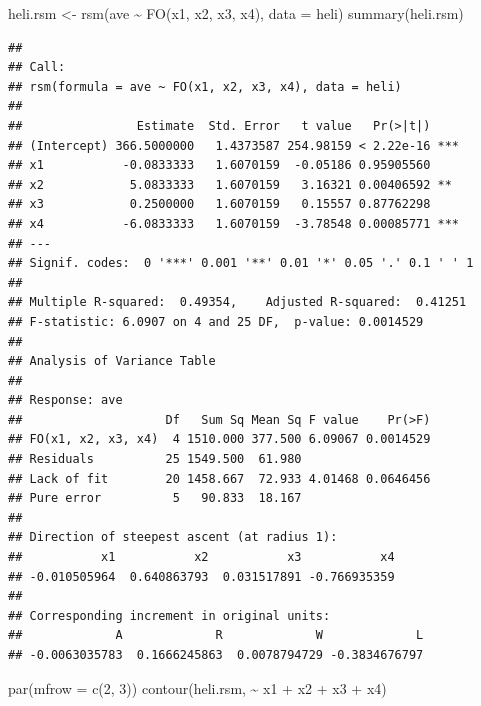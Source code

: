 \documentclass[
]{book}
\newenvironment{Shaded}{\begin{snugshade}}{\end{snugshade}}
\newcommand{\AttributeTok}[1]{\textcolor[rgb]{0.77,0.63,0.00}{#1}}
\newcommand{\DecValTok}[1]{\textcolor[rgb]{0.00,0.00,0.81}{#1}}
\newcommand{\FunctionTok}[1]{\textcolor[rgb]{0.00,0.00,0.00}{#1}}
\newcommand{\NormalTok}[1]{#1}
\newcommand{\OtherTok}[1]{\textcolor[rgb]{0.56,0.35,0.01}{#1}}
\newcommand{\SpecialCharTok}[1]{\textcolor[rgb]{0.00,0.00,0.00}{#1}}
\theoremstyle{definition}
\theoremstyle{definition}
\theoremstyle{definition}
\theoremstyle{definition}
\theoremstyle{remark}
\begin{document}
\begin{Shaded}
\begin{Highlighting}[]
\NormalTok{heli.rsm }\OtherTok{\textless{}{-}} \FunctionTok{rsm}\NormalTok{(ave }\SpecialCharTok{\textasciitilde{}}  \FunctionTok{FO}\NormalTok{(x1, x2, x3, x4), }\AttributeTok{data =}\NormalTok{ heli)}
\FunctionTok{summary}\NormalTok{(heli.rsm)}
\end{Highlighting}
\end{Shaded}

\begin{verbatim}
## 
## Call:
## rsm(formula = ave ~ FO(x1, x2, x3, x4), data = heli)
## 
##                Estimate  Std. Error   t value   Pr(>|t|)    
## (Intercept) 366.5000000   1.4373587 254.98159 < 2.22e-16 ***
## x1           -0.0833333   1.6070159  -0.05186 0.95905560    
## x2            5.0833333   1.6070159   3.16321 0.00406592 ** 
## x3            0.2500000   1.6070159   0.15557 0.87762298    
## x4           -6.0833333   1.6070159  -3.78548 0.00085771 ***
## ---
## Signif. codes:  0 '***' 0.001 '**' 0.01 '*' 0.05 '.' 0.1 ' ' 1
## 
## Multiple R-squared:  0.49354,    Adjusted R-squared:  0.41251 
## F-statistic: 6.0907 on 4 and 25 DF,  p-value: 0.0014529
## 
## Analysis of Variance Table
## 
## Response: ave
##                    Df   Sum Sq Mean Sq F value    Pr(>F)
## FO(x1, x2, x3, x4)  4 1510.000 377.500 6.09067 0.0014529
## Residuals          25 1549.500  61.980                  
## Lack of fit        20 1458.667  72.933 4.01468 0.0646456
## Pure error          5   90.833  18.167                  
## 
## Direction of steepest ascent (at radius 1):
##           x1           x2           x3           x4 
## -0.010505964  0.640863793  0.031517891 -0.766935359 
## 
## Corresponding increment in original units:
##             A             R             W             L 
## -0.0063035783  0.1666245863  0.0078794729 -0.3834676797
\end{verbatim}

\begin{Shaded}
\begin{Highlighting}[]
 \FunctionTok{par}\NormalTok{(}\AttributeTok{mfrow =} \FunctionTok{c}\NormalTok{(}\DecValTok{2}\NormalTok{, }\DecValTok{3}\NormalTok{))}
\FunctionTok{contour}\NormalTok{(heli.rsm, }\SpecialCharTok{\textasciitilde{}}\NormalTok{ x1 }\SpecialCharTok{+}\NormalTok{ x2 }\SpecialCharTok{+}\NormalTok{ x3 }\SpecialCharTok{+}\NormalTok{ x4)}
\end{Highlighting}
\end{Shaded}
\end{document}
